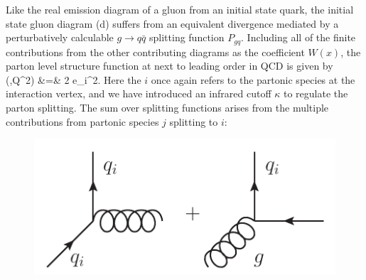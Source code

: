 Like the real emission diagram of a gluon from an initial state quark, the initial state gluon diagram (d) suffers from an equivalent divergence mediated by a perturbatively calculable $g\to q\bar{q}$ splitting function $P_{gq}$. Including all of the finite contributions from the other contributing diagrams as the coefficient $W(x)$, the parton level structure function at next to leading order in QCD is given by
\ba
 (\xi,Q^2) &=& 2 e_i^2. \label{eq:f2plnlo}
\ea
Here the $i$ once again refers to the partonic species at the interaction vertex, and we have introduced an infrared cutoff $\kappa$ to regulate the parton splitting. The sum over splitting functions arises from the multiple contributions from partonic species $j$ splitting to $i$:
\begin{figure}[ht]
\centering
\includegraphics[scale=0.6]{2-PDFs/figs/qgq.pdf}
\end{figure}

